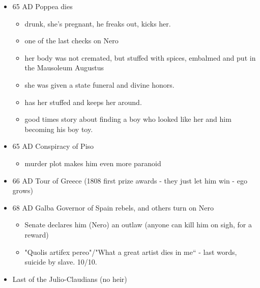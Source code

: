 \documentclass[12pt, twoside]{article}
\begin{document}
\begin{itemize}
\begin{itemize}
	\end{itemize}
\item 65 AD Poppea dies
	\begin{itemize}
	\item drunk, she's pregnant, he freaks out, kicks her.
	\item one of the last checks on Nero
	\item her body was not cremated, but stuffed with spices, embalmed and put in the Mausoleum Augustus
	\item she was given a state funeral and divine honors.
	\item has her stuffed and keeps her around.
	\item good times story about finding a boy who looked like her and him becoming his boy toy.
	\end{itemize}
\item 65 AD Conspiracy of Piso
	\begin{itemize}
	\item murder plot makes him even more paranoid
	\end{itemize}
\item 66 AD Tour of Greece (1808 first prize awards - they just let him win - ego grows)
\item 68 AD Galba Governor of Spain rebels, and others turn on Nero
	\begin{itemize}
	\item Senate declares him (Nero) an outlaw (anyone can kill him on sigh, for a reward)
	\item "Quolis artifex pereo"/"What a great artist dies in me“ - last words, suicide by slave.  10/10.
	\end{itemize}
\item Last of the Julio-Claudians (no heir)
\end{itemize}
\end{document}
